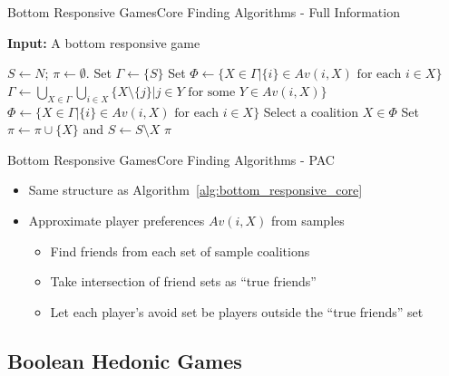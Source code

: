 \documentclass[xcolor=dvipsnames]{beamer}
\newcommand{\Av}{\mathit{Av}}
\begin{document}
\begin{frame}{Bottom Responsive Games}{Core Finding Algorithms - Full Information}
  \begin{algorithm}[H]
    \caption{Bottom Responsive Game Core Finding Algorithm}
    \label{alg:bottom_responsive_core}
    \textbf{Input:} A bottom responsive game
    \begin{algorithmic}[1]

    \State $S \leftarrow N$; $\pi \leftarrow \emptyset$.
      \State \label{bottom_responsive_core:select_begin} Set $\Gamma \leftarrow \{S\}$
      \State Set $\Phi \leftarrow \lbrace X \in \Gamma | \{i\} \in \Av(i, X) \text{ for each } i \in X \rbrace$
      \While {$\Phi = \emptyset$}
        \State $\Gamma \leftarrow \underset{X \in \Gamma}{\bigcup} \underset{i \in X}{\bigcup} \{ X \text{\textbackslash} \{j\} | j \in Y \text{ for some } Y \in \Av(i, X)\}$
        \State $\Phi \leftarrow \lbrace X \in \Gamma | \{i\} \in \Av(i, X) \text{ for each } i \in X \rbrace$
      \EndWhile
      \State \label{bottom_responsive_core:select_end} Select a coalition
        $X \in \Phi$
      \State \label{bottom_responsive_core:reduce} Set
        $\pi \leftarrow \pi \cup \lbrace X \rbrace$ and
        $S \leftarrow  S \setminus X$
    \EndWhile
    \State \Return $\pi$

    \end{algorithmic}
  \end{algorithm}
\end{frame}


\begin{frame}{Bottom Responsive Games}{Core Finding Algorithms - PAC}
  \begin{itemize}
    \item Same structure as Algorithm~\ref{alg:bottom_responsive_core}
    \item Approximate player preferences $\Av(i, X)$ from samples
    \begin{itemize}
      \item Find friends from each set of sample coalitions
      \item Take intersection of friend sets as ``true friends''
      \item Let each player's avoid set be players outside the ``true friends'' set
    \end{itemize}
  \end{itemize}
\end{frame}


\subsection{Boolean Hedonic Games}
\end{document}
